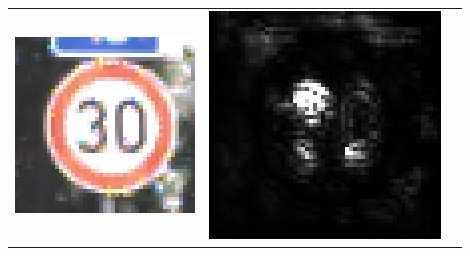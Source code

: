 \begin{table}
	\centering
	\begin{tabular}{p{4.4cm}p{4.4cm}p{4.4cm}}
		\includegraphics[width=\linewidth]{Images/AnPe/10771} & \includegraphics[width=\linewidth]{Images/AnPe/10771_guided} &

\end{tabular}
\end{table}
